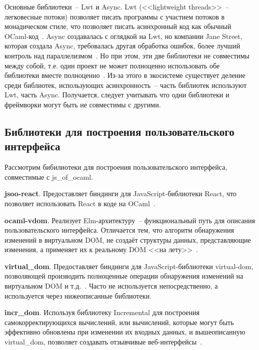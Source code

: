 Основные библиотеки~-- Lwt и Async. Lwt (<<lightweight threads>>~-- легковесные потоки)
позволяет писать программы с участием потоков в монадическом стиле, что позволяет писать
асинхронный код как обычный OCaml-код~\cite[с.~1]{vouillon-lwt}. Async создавалась с оглядкой на Lwt,
но компании Jane Street, которая создала Async, требовалась другая обработка ошибок,
более лучший контроль над параллелизмом~\cite{announcing-async}. Но при этом, эти две библиотеки
не совместимы между собой, т.е. один проект не может полноценно использовать обе библиотеки
вместе полноценно~\cite{rgrinberg-async}. Из-за этого в экосистеме существует деление среди библиотек,
использующих асинхронность~-- часть библиотек используют Lwt, часть Async. Получается, следует
учитывать что одни библиотеки и фреймворки могут быть не совместимы с другими.

\subsection{Библиотеки для построения пользовательского интерфейса}\label{bonsai}

Рассмотрим бибилиотеки для построения пользовательского интерфейса, совместимые с js\_of\_ocaml.

\textbf{jsoo-react}. Предоставляет биндинги для JavaScript-библиотеки React,
что позволяет использовать React в коде на OCaml~\cite{jsoo-react}.

\textbf{ocaml-vdom}. Реализует Elm-архитектуру~-- функциональный путь для описания пользовательского интерфейса.
Отличается тем, что алгоритм обнаружения изменений в виртуальном DOM, не создаёт структуры данных,
представляющие изменения, а применяет их к реальному DOM <<на лету>>~\cite{lexifi-vdom}.

\textbf{virtual\_dom}. Предоставляет биндинги для JavaScript-библиотеки virtual-dom, позволяющей
производить полноценные операции обнаружения изменений на виртуальном DOM и т.д.~\cite{janestreet-virtualdom}.
Часто не используется непосредственно, а используется через нижеописанные библиотеки.

\textbf{incr\_dom}. Используя библиотеку Incremental для построения самокорректирующихся вычислений,
или вычислений, которые могут быть эффективно обновлены при изменении их входных данных,
и вышеописанную virtual\_dom,
позволяет создавать отзывчивые веб-интерфейсы~\cite{janestreet-opensource}.

